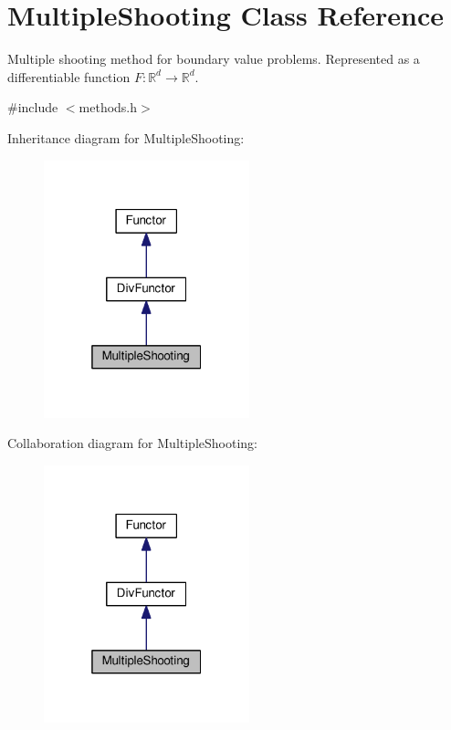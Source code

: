 \hypertarget{classMultipleShooting}{}\section{Multiple\+Shooting Class Reference}
\label{classMultipleShooting}


Multiple shooting method for boundary value problems. Represented as a differentiable function $F: \mathbb{R}^d \rightarrow \mathbb{R}^d$.  




{\ttfamily \#include $<$methods.\+h$>$}



Inheritance diagram for Multiple\+Shooting\+:\nopagebreak
\begin{figure}[H]
\begin{center}
\leavevmode
\includegraphics[width=169pt]{classMultipleShooting__inherit__graph}
\end{center}
\end{figure}


Collaboration diagram for Multiple\+Shooting\+:\nopagebreak
\begin{figure}[H]
\begin{center}
\leavevmode
\includegraphics[width=169pt]{classMultipleShooting__coll__graph}
\end{center}
\end{figure}
